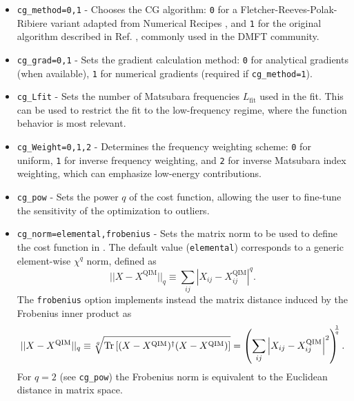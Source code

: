 \documentclass[edipack_sp.tex]{subfiles}
\begin{document}
\begin{itemize}
\item \texttt{cg\_method=0,1} - Chooses the CG algorithm: 
\texttt{0} for a Fletcher-Reeves-Polak-Ribiere variant adapted from 
Numerical Recipes \cite{NumRec77}, and \texttt{1} for the original 
algorithm described in Ref. \cite{Georges1996RMP}, commonly used 
in the DMFT community.
\item \texttt{cg\_grad=0,1} - Sets the gradient calculation method: 
\texttt{0} for analytical gradients (when available), \texttt{1} for 
numerical gradients (required if \texttt{cg\_method=1}).
\item \texttt{cg\_Lfit} - Sets the number of Matsubara frequencies 
$L_\mathrm{fit}$ used in the fit. This can be used to restrict the 
fit to the low-frequency regime, where the function behavior is 
most relevant.
\item \texttt{cg\_Weight=0,1,2} - Determines the frequency weighting 
scheme: \texttt{0} for uniform, \texttt{1} for inverse frequency 
weighting, and \texttt{2} for inverse Matsubara index weighting, which 
can emphasize low-energy contributions.
\item \texttt{cg\_pow} - Sets the power $q$ of the cost function, 
allowing the user to fine-tune the sensitivity of the optimization 
to outliers.
\item \texttt{cg\_norm=elemental,frobenius} - Sets the matrix norm to be used to define the cost function in . The default value (\texttt{elemental}) corresponds to a generic element-wise $\chi^q$ norm, defined as 
\begin{equation*}
    ||X-X^\mathrm{QIM}||_q \equiv {\sum_{ij} \left|X_{ij}-X^\mathrm{QIM}_{ij}\right|^q}.
\end{equation*}
The \texttt{frobenius} option implements instead the matrix distance induced by the Frobenius inner product as
\begin{equation*}
    ||X-X^\mathrm{QIM}||_q \equiv 
    \sqrt[q]{{\rm Tr}\left[(X-X^\mathrm{QIM})^\dagger(X-X^\mathrm{QIM})\right]} =
    \left(\sum_{ij} \left|X_{ij}-X^\mathrm{QIM}_{ij}\right|^2 \right)^{\!\!\!\frac{1}{q}}.
\end{equation*}
For $q=2$ (see \texttt{cg\_pow}) the Frobenius norm is equivalent
to the Euclidean distance in matrix space. 
\end{itemize}
\end{document}
